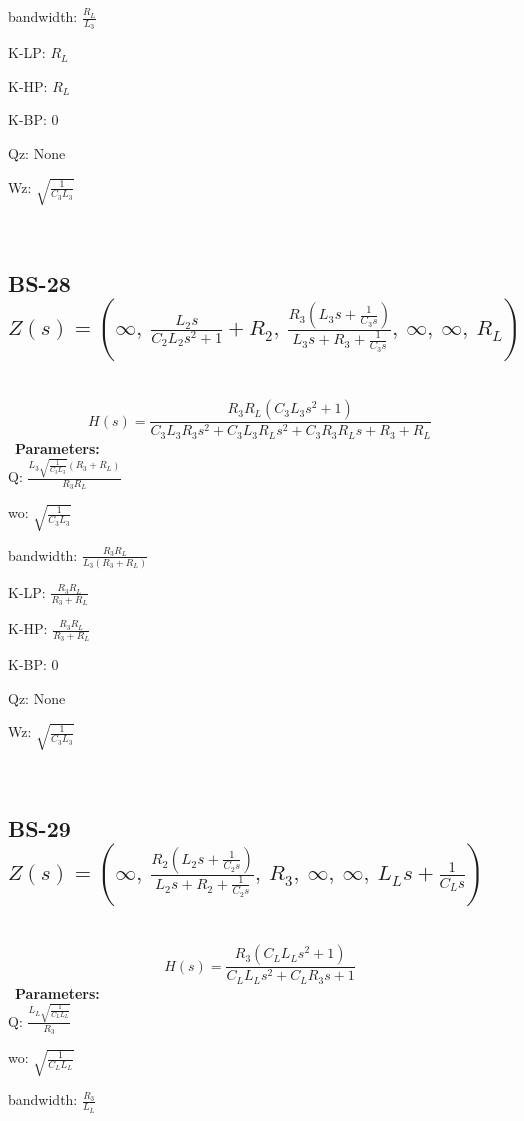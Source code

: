 \documentclass{article}
\begin{document}
bandwidth: $\frac{R_{L}}{L_{3}}$\ 

K-LP: $R_{L}$\ 

K-HP: $R_{L}$\ 

K-BP: $0$\ 

Qz: $\text{None}$\ 

Wz: $\sqrt{\frac{1}{C_{3} L_{3}}}$\ 

\ 

\subsection{BS-28 $Z(s) = \left( \infty, \  \frac{L_{2} s}{C_{2} L_{2} s^{2} + 1} + R_{2}, \  \frac{R_{3} \left(L_{3} s + \frac{1}{C_{3} s}\right)}{L_{3} s + R_{3} + \frac{1}{C_{3} s}}, \  \infty, \  \infty, \  R_{L}\right)$ } \ 
\textbf{\[H(s) = \frac{R_{3} R_{L} \left(C_{3} L_{3} s^{2} + 1\right)}{C_{3} L_{3} R_{3} s^{2} + C_{3} L_{3} R_{L} s^{2} + C_{3} R_{3} R_{L} s + R_{3} + R_{L}}\] } \ 
\textbf{Parameters:}\\ 

Q: $\frac{L_{3} \sqrt{\frac{1}{C_{3} L_{3}}} \left(R_{3} + R_{L}\right)}{R_{3} R_{L}}$\ 

wo: $\sqrt{\frac{1}{C_{3} L_{3}}}$\ 

bandwidth: $\frac{R_{3} R_{L}}{L_{3} \left(R_{3} + R_{L}\right)}$\ 

K-LP: $\frac{R_{3} R_{L}}{R_{3} + R_{L}}$\ 

K-HP: $\frac{R_{3} R_{L}}{R_{3} + R_{L}}$\ 

K-BP: $0$\ 

Qz: $\text{None}$\ 

Wz: $\sqrt{\frac{1}{C_{3} L_{3}}}$\ 

\ 

\subsection{BS-29 $Z(s) = \left( \infty, \  \frac{R_{2} \left(L_{2} s + \frac{1}{C_{2} s}\right)}{L_{2} s + R_{2} + \frac{1}{C_{2} s}}, \  R_{3}, \  \infty, \  \infty, \  L_{L} s + \frac{1}{C_{L} s}\right)$ } \ 
\textbf{\[H(s) = \frac{R_{3} \left(C_{L} L_{L} s^{2} + 1\right)}{C_{L} L_{L} s^{2} + C_{L} R_{3} s + 1}\] } \ 
\textbf{Parameters:}\\ 

Q: $\frac{L_{L} \sqrt{\frac{1}{C_{L} L_{L}}}}{R_{3}}$\ 

wo: $\sqrt{\frac{1}{C_{L} L_{L}}}$\ 

bandwidth: $\frac{R_{3}}{L_{L}}$\ 
\end{document}
